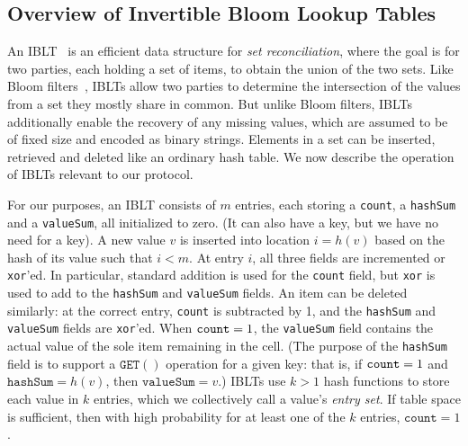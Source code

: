  \subsection{Overview of Invertible Bloom Lookup Tables}
An IBLT~\cite{goodrich:2011} is an efficient data structure for {\em set reconciliation}, where the goal is for two parties, each holding a set of items, to obtain the union of the two sets. Like 
  Bloom filters~\cite{Bloom:1970}, IBLTs allow
  two parties to determine the intersection of the values from a
  set they mostly share in common. But unlike Bloom filters, IBLTs additionally enable the
  recovery of any missing values, which are assumed to be of fixed
  size and encoded as binary strings.  Elements in a set can be
  inserted, retrieved and deleted like an ordinary hash table. We now describe the operation of IBLTs relevant to our protocol.
  
For our purposes, an IBLT consists of $m$ entries, each storing a \texttt{count}, a \texttt{hashSum} and a \texttt{valueSum}, all initialized to zero. (It can also have a key, but we have
no need for a key). A new value $v$ is inserted into location $i=h(v)$ based on
the hash of its value such that $i < m$.  At entry $i$, all three
fields are incremented or \texttt{xor}'ed. In particular, standard
addition is used for the \texttt{count} field, but \texttt{xor} is
used to add to the \texttt{hashSum} and \texttt{valueSum} fields. An
item can be deleted similarly: at the correct entry, \texttt{count}
is subtracted by 1, and the \texttt{hashSum} and \texttt{valueSum}
fields are \texttt{xor}'ed.  When $\mbox{\texttt{count}} = 1$,
the \texttt{valueSum} field contains the actual value of the sole
item remaining in the cell.  (The purpose of the \texttt{hashSum}
field is to support a $\texttt{GET}()$ operation for a given
key: that is, if $\mbox{\texttt{count}} = 1$ and
$\texttt{hashSum} = h(v)$, then
$\texttt{valueSum} = v$.)
IBLTs use $k > 1$ hash functions to store each value in $k$ entries, which we collectively call a value's \emph{entry set}.  
If table space is sufficient, then with high probability for at least one of the $k$
entries, $\texttt{count} = 1$.

